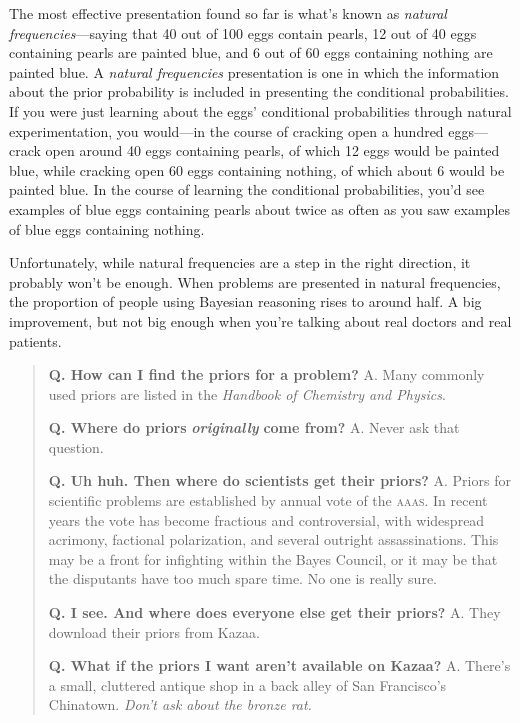 {
 The most effective presentation found so far is
what's known as \textit{natural frequencies}{}---saying
that 40 out of 100 eggs contain pearls, 12 out of 40 eggs containing
pearls are painted blue, and 6 out of 60 eggs containing nothing are
painted blue. A \textit{natural frequencies} presentation is one in
which the information about the prior probability is included in
presenting the conditional probabilities. If you were just learning
about the eggs' conditional probabilities through
natural experimentation, you would---in the course of cracking open a
hundred eggs---crack open around 40 eggs containing pearls, of which 12
eggs would be painted blue, while cracking open 60 eggs containing
nothing, of which about 6 would be painted blue. In the course of
learning the conditional probabilities, you'd see
examples of blue eggs containing pearls about twice as often as you saw
examples of blue eggs containing nothing.}

{
 Unfortunately, while natural frequencies are a step in the right
direction, it probably won't be enough. When problems
are presented in natural frequencies, the proportion of people using
Bayesian reasoning rises to around half. A big improvement, but not big
enough when you're talking about real doctors and real
patients.}

\hr

\begin{quote}
{
 \textbf{Q. How can I find the priors for a problem?}\newline
 A. Many commonly used priors are listed in the \textit{Handbook of
Chemistry and Physics}.}

{
 \textbf{Q. Where do priors }\textbf{\textit{originally}}\textbf{
come from?}\newline
 A. Never ask that question.}

{
 \textbf{Q. Uh huh. Then where do scientists get their
priors?}\newline
 A. Priors for scientific problems are established by annual vote of the
\textsc{aaas}. In recent years the vote has become fractious and controversial,
with widespread acrimony, factional polarization, and several outright
assassinations. This may be a front for infighting within the Bayes
Council, or it may be that the disputants have too much spare time. No
one is really sure.}

{
 \textbf{Q. I see. And where does everyone else get their
priors?}\newline
 A. They download their priors from Kazaa.}

{
 \textbf{Q. What if the priors I want aren't
available on Kazaa?}\newline
 A. There's a small, cluttered antique shop in a back
alley of San Francisco's Chinatown.
\textit{Don't ask about the bronze rat.}}
\end{quote}


